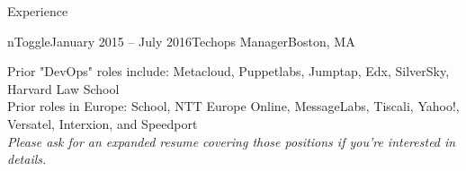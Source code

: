 \documentclass{resume} %
\begin{document}
\begin{rSection}{Experience}
\begin{rSubsection}{nToggle}{January 2015 -- July 2016}{Techops Manager}{Boston, MA}
\end{rSubsection}

\begin{center}
Prior "DevOps" roles include: Metacloud, Puppetlabs, Jumptap, Edx, SilverSky, Harvard Law School\\
Prior roles in Europe: School, NTT Europe Online, MessageLabs, Tiscali, Yahoo!, Versatel, Interxion, and Speedport\\
\textit{Please ask for an expanded resume covering those positions if you're interested in details.}
\end{center}

\end{rSection}
\end{document}
